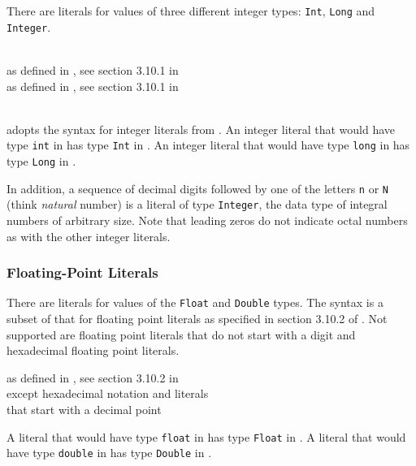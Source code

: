 There are literals for values of three different integer types: \texttt{Int}, \texttt{Long} and \texttt{Integer}.

\begin{flushleft}
  \oder{}  \oder{} \\
 as defined in \java{}, see section 3.10.1 in \cite{langspec3}\\
 as defined in \java{}, see section 3.10.1 in \cite{langspec3}\\
  \\
\end{flushleft}

\frege{} adopts the syntax for integer literals from \java{}. An integer literal that would have type \texttt{int} in \java{} has type \texttt{Int} in \frege{}. An integer literal that would have type \texttt{long} in \java{} has type \texttt{Long} in \frege{}.

In addition, a sequence of decimal digits followed by one of the letters \texttt{n} or \texttt{N} (think \emph{natural} number) is a literal of type \texttt{Integer}, the data type of integral numbers of arbitrary size. Note that leading zeros do not indicate octal numbers as with the other integer literals.


\subsubsection{Floating-Point Literals}

There are literals for values of the \texttt{Float} and \texttt{Double} types. The syntax is a subset of that for \java{} floating point literals as specified in section 3.10.2 of \cite{langspec3}. Not supported are floating point literals that do not start with a digit and hexadecimal floating point literals.

\begin{flushleft}
as defined in \java{}, see section 3.10.2 in \cite{langspec3}\\
\hspace{0.5in} except hexadecimal notation and literals\\
\hspace{0.5in} that start with a decimal point
\end{flushleft}

A literal that would have type \texttt{float} in \java{} has type \texttt{Float} in \frege{}. A literal that would have type \texttt{double} in \java{} has type \texttt{Double} in \frege{}.

